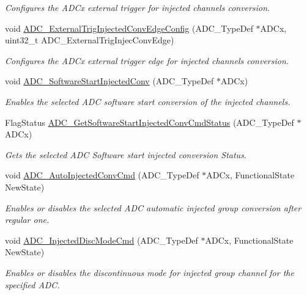 \begin{DoxyCompactItemize}
\begin{DoxyCompactList}\small\item\em Configures the A\-D\-Cx external trigger for injected channels conversion. \end{DoxyCompactList}\item 
void \hyperlink{group___a_d_c___group6_ga62bea56579f04374fbe830d9e55e6fb0}{A\-D\-C\-\_\-\-External\-Trig\-Injected\-Conv\-Edge\-Config} (A\-D\-C\-\_\-\-Type\-Def $\ast$A\-D\-Cx, uint32\-\_\-t A\-D\-C\-\_\-\-External\-Trig\-Injec\-Conv\-Edge)
\begin{DoxyCompactList}\small\item\em Configures the A\-D\-Cx external trigger edge for injected channels conversion. \end{DoxyCompactList}\item 
void \hyperlink{group___a_d_c___group6_ga79b2f6c3c77925b35495f2db228895de}{A\-D\-C\-\_\-\-Software\-Start\-Injected\-Conv} (A\-D\-C\-\_\-\-Type\-Def $\ast$A\-D\-Cx)
\begin{DoxyCompactList}\small\item\em Enables the selected A\-D\-C software start conversion of the injected channels. \end{DoxyCompactList}\item 
Flag\-Status \hyperlink{group___a_d_c___group6_ga8765f8835b8cfed13dce3d8d71767dcc}{A\-D\-C\-\_\-\-Get\-Software\-Start\-Injected\-Conv\-Cmd\-Status} (A\-D\-C\-\_\-\-Type\-Def $\ast$A\-D\-Cx)
\begin{DoxyCompactList}\small\item\em Gets the selected A\-D\-C Software start injected conversion Status. \end{DoxyCompactList}\item 
void \hyperlink{group___a_d_c___group6_ga1ff9c3b8e4bbdd2addfd227f1a506a66}{A\-D\-C\-\_\-\-Auto\-Injected\-Conv\-Cmd} (A\-D\-C\-\_\-\-Type\-Def $\ast$A\-D\-Cx, Functional\-State New\-State)
\begin{DoxyCompactList}\small\item\em Enables or disables the selected A\-D\-C automatic injected group conversion after regular one. \end{DoxyCompactList}\item 
void \hyperlink{group___a_d_c___group6_ga0b583b94183fa4ff287177b9ee808092}{A\-D\-C\-\_\-\-Injected\-Disc\-Mode\-Cmd} (A\-D\-C\-\_\-\-Type\-Def $\ast$A\-D\-Cx, Functional\-State New\-State)
\begin{DoxyCompactList}\small\item\em Enables or disables the discontinuous mode for injected group channel for the specified A\-D\-C. \end{DoxyCompactList}\item 

\end{DoxyCompactItemize}
